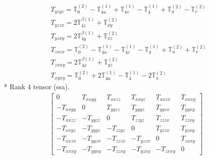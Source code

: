 \documentclass[fleqn,8pt,landscape]{jsarticle}
\begin{document}
\begin{align*}
& T_{yzyz} = \mathbb{T}_{0}^{(2)} - \mathbb{T}_{4u}^{(1)} + \mathbb{T}_{4v}^{(1)} - \mathbb{T}_{4}^{(1)} + \mathbb{T}_{u}^{(2)} - \mathbb{T}_{v}^{(2)} \\
& T_{yzzx} = 2 \mathbb{T}_{4z}^{\beta(1)} + \mathbb{T}_{xy}^{(2)} \\
& T_{yzxy} = 2 \mathbb{T}_{4y}^{\beta(1)} + \mathbb{T}_{xz}^{(2)} \\
& T_{zxzx} = \mathbb{T}_{0}^{(2)} - \mathbb{T}_{4u}^{(1)} - \mathbb{T}_{4v}^{(1)} - \mathbb{T}_{4}^{(1)} + \mathbb{T}_{u}^{(2)} + \mathbb{T}_{v}^{(2)} \\
& T_{zxxy} = 2 \mathbb{T}_{4x}^{\beta(1)} + \mathbb{T}_{yz}^{(2)} \\
& T_{xyxy} = \mathbb{T}_{0}^{(2)} + 2 \mathbb{T}_{4u}^{(1)} - \mathbb{T}_{4}^{(1)} - 2 \mathbb{T}_{u}^{(2)}
\end{align*}
* Rank 4 tensor (ssa).
\begin{align*}
\begin{bmatrix} 0 & T_{xxyy} & T_{xxzz} & T_{xxyz} & T_{xxzx} & T_{xxxy} \\ - T_{xxyy} & 0 & T_{yyzz} & T_{yyyz} & T_{yyzx} & T_{yyxy} \\ - T_{xxzz} & - T_{yyzz} & 0 & T_{zzyz} & T_{zzzx} & T_{zzxy} \\ - T_{xxyz} & - T_{yyyz} & - T_{zzyz} & 0 & T_{yzzx} & T_{yzxy} \\ - T_{xxzx} & - T_{yyzx} & - T_{zzzx} & - T_{yzzx} & 0 & T_{zxxy} \\ - T_{xxxy} & - T_{yyxy} & - T_{zzxy} & - T_{yzxy} & - T_{zxxy} & 0 \end{bmatrix}
\end{align*}
\end{document}
